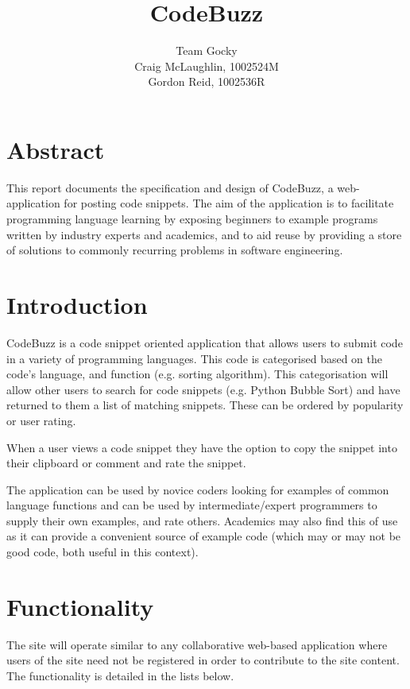 \documentclass[11pt,a4paper]{article}
\title{CodeBuzz}
\author{Team Gocky \\
    Craig McLaughlin, 1002524M \\
    Gordon Reid, 1002536R}
\begin{document}
\maketitle

\newpage

\section*{Abstract}

This report documents the specification and design of CodeBuzz,
a web-application for posting code snippets. The aim of the application is
to facilitate programming language learning by exposing beginners to
example programs written by industry experts and academics, and to
aid reuse by providing a store of solutions to commonly recurring
problems in software engineering. 
\newpage

\tableofcontents
\newpage

\section{Introduction}

CodeBuzz is a code snippet oriented application that allows users to submit code
in a variety of programming languages. This code is categorised based on the
code's language, and function (e.g. sorting algorithm). This categorisation
will allow other users to search for code snippets (e.g. Python Bubble Sort)
and have returned to them a list of matching snippets. These can be ordered
by popularity or user rating.

When a user views a code snippet they have the option to copy the snippet into
their clipboard or comment and rate the snippet.

The application can be used by novice coders looking for examples of common
language functions and can be used by intermediate/expert programmers to supply
their own examples, and rate others. Academics may also find this of use as
it can provide a convenient source of example code (which may or may not be
good code, both useful in this context).

\section{Functionality}

The site will operate similar to any collaborative web-based application
where users of the site need not be registered in order to contribute
to the site content. The functionality is detailed in the lists below.
\end{document}
